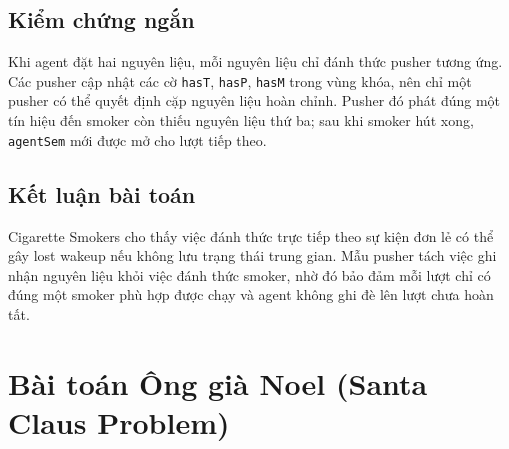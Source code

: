 \begin{algorithmic}[1]
        \State {} 
        \State {}
        \State {}
    \EndWhile
\EndProcedure

        \State {} 
        \State {}
        \State {}
    \EndWhile
\EndProcedure

        \State {} 
        \State {}
        \State {}
    \EndWhile
\EndProcedure
\end{algorithmic}

\subsection{Kiểm chứng ngắn}

Khi agent đặt hai nguyên liệu, mỗi nguyên liệu chỉ đánh thức pusher tương ứng. Các pusher cập nhật các cờ \texttt{hasT}, \texttt{hasP}, \texttt{hasM} trong vùng khóa, nên chỉ một pusher có thể quyết định cặp nguyên liệu hoàn chỉnh. Pusher đó phát đúng một tín hiệu đến smoker còn thiếu nguyên liệu thứ ba; sau khi smoker hút xong, \texttt{agentSem} mới được mở cho lượt tiếp theo.

\subsection{Kết luận bài toán}

Cigarette Smokers cho thấy việc đánh thức trực tiếp theo sự kiện đơn lẻ có thể gây lost wakeup nếu không lưu trạng thái trung gian. Mẫu pusher tách việc ghi nhận nguyên liệu khỏi việc đánh thức smoker, nhờ đó bảo đảm mỗi lượt chỉ có đúng một smoker phù hợp được chạy và agent không ghi đè lên lượt chưa hoàn tất.

\newpage
\section{Bài toán Ông già Noel (Santa Claus Problem)}


